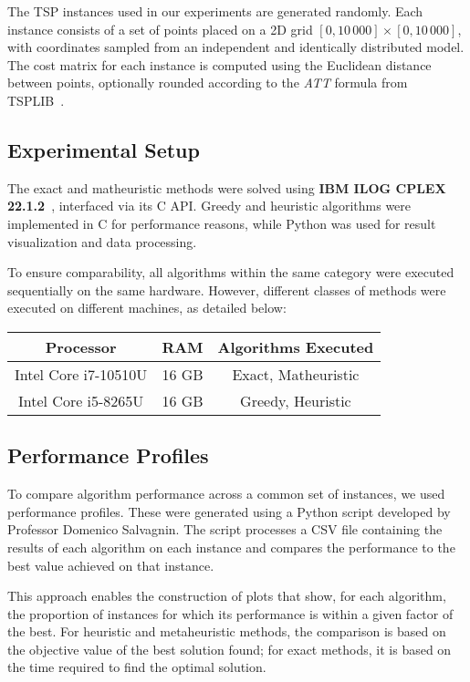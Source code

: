 The TSP instances used in our experiments are generated randomly. Each instance consists of a set of points placed on a 2D grid $[0, 10\,000] \times [0, 10\,000]$, with coordinates sampled from an independent and identically distributed model. The cost matrix for each instance is computed using the Euclidean distance between points, optionally rounded according to the \emph{ATT} formula from TSPLIB~\cite{reinelt1995tsplib}.

\subsection{Experimental Setup}

The exact and matheuristic methods were solved using \textbf{IBM ILOG CPLEX 22.1.2}~\cite{cplex2023}, interfaced via its C API. Greedy and heuristic algorithms were implemented in C for performance reasons, while Python was used for result visualization and data processing.

To ensure comparability, all algorithms within the same category were executed sequentially on the same hardware. However, different classes of methods were executed on different machines, as detailed below:

\begin{center}
\begin{tabular}{ c | c | c }
  \textbf{Processor} & \textbf{RAM} & \textbf{Algorithms Executed} \\
  \hline
  Intel Core i7-10510U & 16 GB & Exact, Matheuristic \\
  Intel Core i5-8265U  & 16 GB & Greedy, Heuristic \\
\end{tabular}
\end{center}

\subsection{Performance Profiles}

To compare algorithm performance across a common set of instances, we used performance profiles. These were generated using a Python script developed by Professor Domenico Salvagnin. The script processes a CSV file containing the results of each algorithm on each instance and compares the performance to the best value achieved on that instance.

This approach enables the construction of plots that show, for each algorithm, the proportion of instances for which its performance is within a given factor of the best. For heuristic and metaheuristic methods, the comparison is based on the objective value of the best solution found; for exact methods, it is based on the time required to find the optimal solution.


